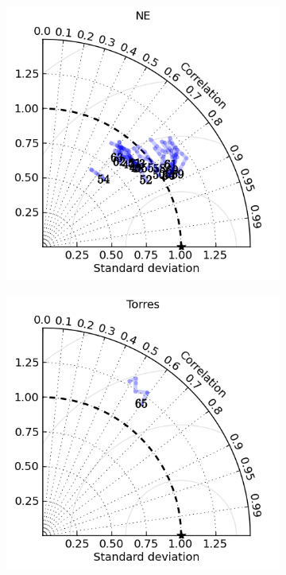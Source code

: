 \begin{figure}[H]
\begin{subfigure}{0.30\textwidth}
        \caption{}
    \end{subfigure}
    \begin{subfigure}{0.30\textwidth}
        \includegraphics[width=\textwidth]{figures/plots/taylor_diag_res_NE.png}
        \caption{}
    \end{subfigure}
    \begin{subfigure}{0.30\textwidth}
        \includegraphics[width=\textwidth]{figures/plots/taylor_diag_res_Torres.png}

\end{subfigure}
\end{figure}
